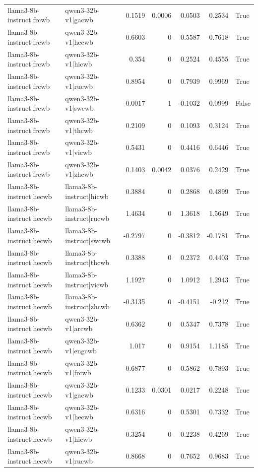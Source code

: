 \begin{table}
\begin{tabular}{l l r r r r l}
llama3-8b-instruct|frcwb & qwen3-32b-v1|gacwb & 0.1519 & 0.0006 & 0.0503 & 0.2534 & True \\
llama3-8b-instruct|frcwb & qwen3-32b-v1|hecwb & 0.6603 & 0 & 0.5587 & 0.7618 & True \\
llama3-8b-instruct|frcwb & qwen3-32b-v1|hicwb & 0.354 & 0 & 0.2524 & 0.4555 & True \\
llama3-8b-instruct|frcwb & qwen3-32b-v1|rucwb & 0.8954 & 0 & 0.7939 & 0.9969 & True \\
llama3-8b-instruct|frcwb & qwen3-32b-v1|swcwb & -0.0017 & 1 & -0.1032 & 0.0999 & False \\
llama3-8b-instruct|frcwb & qwen3-32b-v1|thcwb & 0.2109 & 0 & 0.1093 & 0.3124 & True \\
llama3-8b-instruct|frcwb & qwen3-32b-v1|vicwb & 0.5431 & 0 & 0.4416 & 0.6446 & True \\
llama3-8b-instruct|frcwb & qwen3-32b-v1|zhcwb & 0.1403 & 0.0042 & 0.0376 & 0.2429 & True \\
llama3-8b-instruct|hecwb & llama3-8b-instruct|hicwb & 0.3884 & 0 & 0.2868 & 0.4899 & True \\
llama3-8b-instruct|hecwb & llama3-8b-instruct|rucwb & 1.4634 & 0 & 1.3618 & 1.5649 & True \\
llama3-8b-instruct|hecwb & llama3-8b-instruct|swcwb & -0.2797 & 0 & -0.3812 & -0.1781 & True \\
llama3-8b-instruct|hecwb & llama3-8b-instruct|thcwb & 0.3388 & 0 & 0.2372 & 0.4403 & True \\
llama3-8b-instruct|hecwb & llama3-8b-instruct|vicwb & 1.1927 & 0 & 1.0912 & 1.2943 & True \\
llama3-8b-instruct|hecwb & llama3-8b-instruct|zhcwb & -0.3135 & 0 & -0.4151 & -0.212 & True \\
llama3-8b-instruct|hecwb & qwen3-32b-v1|arcwb & 0.6362 & 0 & 0.5347 & 0.7378 & True \\
llama3-8b-instruct|hecwb & qwen3-32b-v1|engcwb & 1.017 & 0 & 0.9154 & 1.1185 & True \\
llama3-8b-instruct|hecwb & qwen3-32b-v1|frcwb & 0.6877 & 0 & 0.5862 & 0.7893 & True \\
llama3-8b-instruct|hecwb & qwen3-32b-v1|gacwb & 0.1233 & 0.0301 & 0.0217 & 0.2248 & True \\
llama3-8b-instruct|hecwb & qwen3-32b-v1|hecwb & 0.6316 & 0 & 0.5301 & 0.7332 & True \\
llama3-8b-instruct|hecwb & qwen3-32b-v1|hicwb & 0.3254 & 0 & 0.2238 & 0.4269 & True \\
llama3-8b-instruct|hecwb & qwen3-32b-v1|rucwb & 0.8668 & 0 & 0.7652 & 0.9683 & True \\

\end{tabular}
\end{table}
